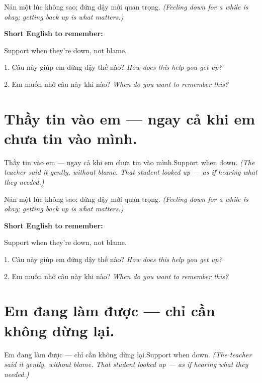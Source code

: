 \begin{baihoc}
Nản một lúc không sao; đứng dậy mới quan trọng.
\textit{(Feeling down for a while is okay; getting back up is what matters.)}
\end{baihoc}

\begin{ghinhoanh}
\textbf{Short English to remember:}

Support when they're down, not blame.

\end{ghinhoanh}

\begin{tuhocnhanh}
1. Câu này giúp em đứng dậy thế nào? \textit{How does this help you get up?}

2. Em muốn nhớ câu này khi nào? \textit{When do you want to remember this?}
\end{tuhocnhanh}
\ngancach


\section{Thầy tin vào em — ngay cả khi em chưa tin vào mình.}
\begin{truyen}{Thầy tin vào em — ngay cả khi em chưa tin vào mình.}{Support when down.}
\textit{(The teacher said it gently, without blame. That student looked up — as if hearing what they needed.)}
\end{truyen}

\begin{baihoc}
Nản một lúc không sao; đứng dậy mới quan trọng.
\textit{(Feeling down for a while is okay; getting back up is what matters.)}
\end{baihoc}

\begin{ghinhoanh}
\textbf{Short English to remember:}

Support when they're down, not blame.

\end{ghinhoanh}

\begin{tuhocnhanh}
1. Câu này giúp em đứng dậy thế nào? \textit{How does this help you get up?}

2. Em muốn nhớ câu này khi nào? \textit{When do you want to remember this?}
\end{tuhocnhanh}
\ngancach


\section{Em đang làm được — chỉ cần không dừng lại.}
\begin{truyen}{Em đang làm được — chỉ cần không dừng lại.}{Support when down.}
\textit{(The teacher said it gently, without blame. That student looked up — as if hearing what they needed.)}
\end{truyen}

